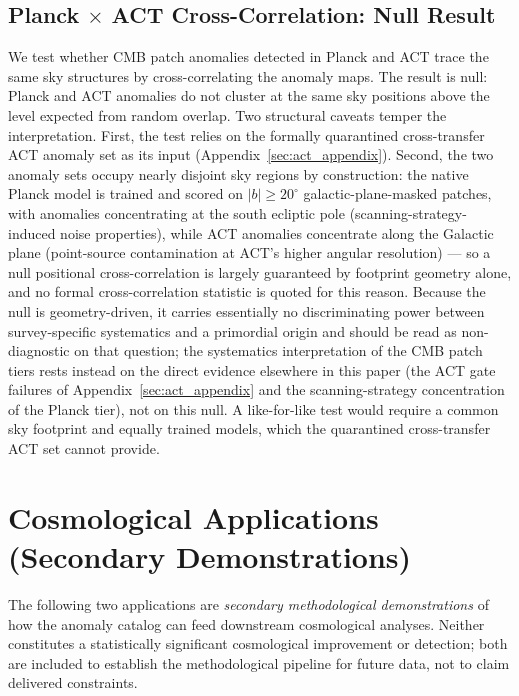 \documentclass[aps,prd,twocolumn,superscriptaddress,showpacs,preprintnumbers,nofootinbib,longbibliography,floatfix]{revtex4-2}
\begin{document}
\subsection{Planck $\times$ ACT Cross-Correlation: Null Result}\label{sec:planck_act_null}

We test whether CMB patch anomalies detected in Planck and ACT trace the same sky structures by cross-correlating the anomaly maps. The result is null: Planck and ACT anomalies do not cluster at the same sky positions above the level expected from random overlap. Two structural caveats temper the interpretation. First, the test relies on the formally quarantined cross-transfer ACT anomaly set as its input (Appendix~\ref{sec:act_appendix}). Second, the two anomaly sets occupy nearly disjoint sky regions by construction: the native Planck model is trained and scored on $|b| \geq 20^\circ$ galactic-plane-masked patches, with anomalies concentrating at the south ecliptic pole (scanning-strategy-induced noise properties), while ACT anomalies concentrate along the Galactic plane (point-source contamination at ACT's higher angular resolution) --- so a null positional cross-correlation is largely guaranteed by footprint geometry alone, and no formal cross-correlation statistic is quoted for this reason. Because the null is geometry-driven, it carries essentially no discriminating power between survey-specific systematics and a primordial origin and should be read as non-diagnostic on that question; the systematics interpretation of the CMB patch tiers rests instead on the direct evidence elsewhere in this paper (the ACT gate failures of Appendix~\ref{sec:act_appendix} and the scanning-strategy concentration of the Planck tier), not on this null. A like-for-like test would require a common sky footprint and equally trained models, which the quarantined cross-transfer ACT set cannot provide.


\section{Cosmological Applications (Secondary Demonstrations)}\label{sec:fnl}

The following two applications are \emph{secondary methodological demonstrations} of how the anomaly catalog can feed downstream cosmological analyses. Neither constitutes a statistically significant cosmological improvement or detection; both are included to establish the methodological pipeline for future data, not to claim delivered constraints.
\end{document}
